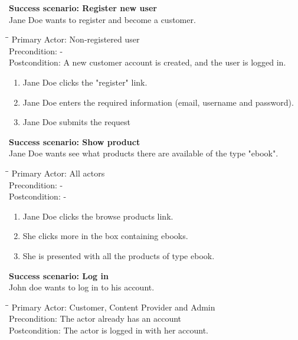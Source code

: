 \textbf{Success scenario: Register new user} \\
Jane Doe wants to register and become a customer. 
\begin{tabbing}
\hspace{5mm}\=\hspace{28mm}\=\kill
\>Primary Actor:\> Non-registered user\\
\>Precondition:\> -\\
\>Postcondition:\> A new customer account is created, and the user is logged in.
\end{tabbing}
\begin{enumerate} \setlength{\itemsep}{-1mm}
	\item Jane Doe clicks the "register" link.
	\item Jane Doe enters the required information (email, username and password).
	\item Jane Doe submits the request
\end{enumerate}
\vspace{3mm}
\textbf{Success scenario: Show product} \\
Jane Doe wants see what products there are available of the type "ebook".
\begin{tabbing}
\hspace{5mm}\=\hspace{26mm}\=\kill
\>Primary Actor:\> All actors\\
\>Precondition:\> -\\
\>Postcondition:\> -
\end{tabbing}
\begin{enumerate} \setlength{\itemsep}{-1mm}
	\item Jane Doe clicks the browse products link.
	\item She clicks more in the box containing ebooks.
	\item She is presented with all the products of type ebook.
\end{enumerate}
\vspace{3mm}
\textbf{Success scenario: Log in} \\
John doe wants to log in to his account. 
\begin{tabbing}
\hspace{5mm}\=\hspace{26mm}\=\kill
\>Primary Actor:\> Customer, Content Provider and Admin\\
\>Precondition:\> The actor already has an account\\
\>Postcondition:\> The actor is logged in with her account.
\end{tabbing}
